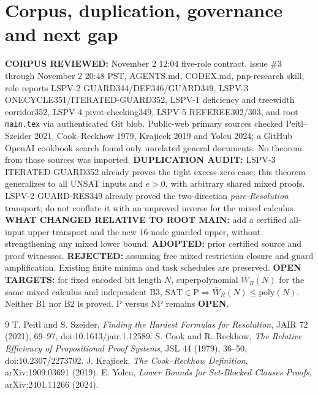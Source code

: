 \documentclass[11pt]{article}
\begin{document}
\section*{Corpus, duplication, governance and next gap}
\textbf{CORPUS REVIEWED:} November 2 12:04 five-role contract, issue \#3 through November 2 20:48 PST, AGENTS.md, CODEX.md, pnp-research skill, role reports LSPV-2 GUARD344/DEF346/GUARD349, LSPV-3 ONECYCLE351/ITERATED-GUARD352, LSPV-1 deficiency and treewidth corridor352, LSPV-4 pivot-checking349, LSPV-5 REFEREE302/303, and root \texttt{main.tex} via authenticated Git blob. Public-web primary sources checked Peitl--Szeider 2021, Cook--Reckhow 1979, Krajicek 2019 and Yolcu 2024; a GitHub OpenAI cookbook search found only unrelated general documents. No theorem from those sources was imported.
\textbf{DUPLICATION AUDIT:} LSPV-3 ITERATED-GUARD352 already proves the tight excess-zero case; this theorem generalizes to all UNSAT inputs and $e>0$, with arbitrary shared mixed proofs. LSPV-2 GUARD-RES349 already proved the two-direction \emph{pure-Resolution} transport; do not conflate it with an unproved inverse for the mixed calculus. \textbf{WHAT CHANGED RELATIVE TO ROOT MAIN:} add a certified all-input upper transport and the new 16-node guarded upper, without strengthening any mixed lower bound. \textbf{ADOPTED:} prior certified source and proof witnesses. \textbf{REJECTED:} assuming free mixed restriction closure and guard amplification. Existing finite minima and task schedules are preserved.
\textbf{OPEN TARGETS:} for fixed encoded bit length $N$, superpolynomial $\overline W_R(N)$ for the same mixed calculus and independent B3, $\mathrm{SAT}\in\mathrm P\Longrightarrow\overline W_R(N)\le\mathrm{poly}(N)$. Neither B1 nor B2 is proved. P versus NP remains \textbf{OPEN}.
\begin{thebibliography}{9}
 T. Peitl and S. Szeider, \emph{Finding the Hardest Formulas for Resolution}, JAIR 72 (2021), 69--97, doi:10.1613/jair.1.12589.
 S. Cook and R. Reckhow, \emph{The Relative Efficiency of Propositional Proof Systems}, JSL 44 (1979), 36--50, doi:10.2307/2273702.
 J. Krajicek, \emph{The Cook--Reckhow Definition}, arXiv:1909.03691 (2019).
 E. Yolcu, \emph{Lower Bounds for Set-Blocked Clauses Proofs}, arXiv:2401.11266 (2024).
\end{thebibliography}
\end{document}
